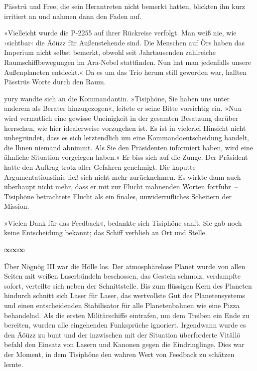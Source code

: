 Pässtrü und Free, die sein Herantreten nicht bemerkt hatten, blickten ihn kurz irritiert an und nahmen dann den Faden auf.

»Vielleicht wurde die P-2255 auf ihrer Rückreise verfolgt. Man weiß nie, wie ›sichtbar‹ die Äöüzz für Außenstehende sind. Die Menschen auf Örs haben das Imperium nicht selbst bemerkt, obwohl seit Jahrtausenden zahlreiche Raumschiffbewegungen im Ara-Nebel stattfinden. Nun hat man jedenfalls unsere Außenplaneten entdeckt.« Da es um das Trio herum still geworden war, hallten Pässtrüs Worte durch den Raum.

yury wandte sich an die Kommandantin. »Tisiphöne, Sie haben uns unter anderem als Berater hinzugezogen«, leitete er seine Bitte vorsichtig ein. »Nun wird vermutlich eine gewisse Uneinigkeit in der gesamten Besatzung darüber herrschen, wie hier idealerweise vorzugehen ist. Es ist in vielerlei Hinsicht nicht unbegründet, dass es sich letztendlich um eine Kommandoentscheidung handelt, die Ihnen niemand abnimmt. Als Sie den Präsidenten informiert haben, wird eine ähnliche Situation vorgelegen haben.« Er biss sich auf die Zunge. Der Präsident hatte den Auftrag trotz aller Gefahren genehmigt. Die kaputte Argumentationslinie ließ sich nicht mehr zurücknehmen. Es wirkte dann auch überhaupt nicht mehr, dass er mit zur Flucht mahnenden Worten fortfuhr~– Tisiphöne betrachtete Flucht als ein finales, unwiderrufliches Scheitern der Mission.

»Vielen Dank für das Feedback«, bedankte sich Tisiphöne sanft. Sie gab noch keine Entscheidung bekannt; das Schiff verblieb an Ort und Stelle.

\begin{center}
∞∞∞
\end{center}

Über Nögnög III war die Hölle los. Der atmosphärelose Planet wurde von allen Seiten mit weißen Laserbündeln beschossen, das Gestein schmolz, verdampfte sofort, verteilte sich neben der Schnittstelle. Bis zum flüssigen Kern des Planeten hindurch schnitt sich Laser für Laser, das wertvollste Gut des Planetensystems und einen entscheidenden Stabilisator für alle Planetenbahnen wie eine Pizza behandelnd. Als die ersten Militärschiffe eintrafen, um dem Treiben ein Ende zu bereiten, wurden alle eingehenden Funksprüche ignoriert. Irgendwann wurde es den Äöüzz zu bunt und der inzwischen mit der Situation überforderte Vitällö befahl den Einsatz von Lasern und Kanonen gegen die Eindringlinge. Dies war der Moment, in dem Tisiphöne den wahren Wert von Feedback zu schätzen lernte.

